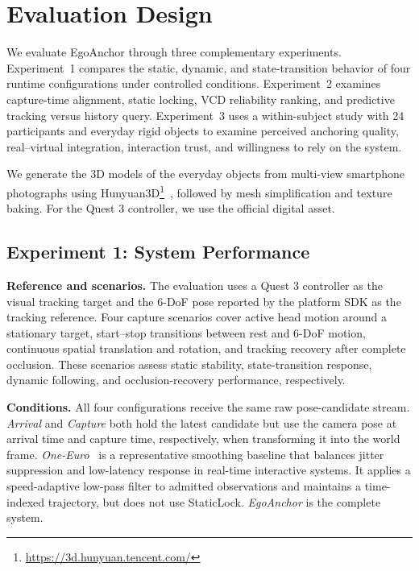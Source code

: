 \documentclass[review]{vgtc}
\begin{document}
\section{Evaluation Design}\label{sec:evaluation}

We evaluate EgoAnchor through three complementary experiments. Experiment~1 compares the static, dynamic, and state-transition behavior of four runtime configurations under controlled conditions. Experiment~2 examines capture-time alignment, static locking, VCD reliability ranking, and predictive tracking versus history query. Experiment~3 uses a within-subject study with 24 participants and everyday rigid objects to examine perceived anchoring quality, real--virtual integration, interaction trust, and willingness to rely on the system.

We generate the 3D models of the everyday objects from multi-view smartphone photographs using Hunyuan3D\footnote{\url{https://3d.hunyuan.tencent.com/}}~\cite{hunyuan3d22025tencent}, followed by mesh simplification and texture baking. For the Quest 3 controller, we use the official digital asset.

\subsection{Experiment 1: System Performance}\label{sec:exp1-design}

\textbf{Reference and scenarios.}
The evaluation uses a Quest 3 controller as the visual tracking target and the 6-DoF pose reported by the platform SDK as the tracking reference. Four capture scenarios cover active head motion around a stationary target, start--stop transitions between rest and 6-DoF motion, continuous spatial translation and rotation, and tracking recovery after complete occlusion. These scenarios assess static stability, state-transition response, dynamic following, and occlusion-recovery performance, respectively.

\textbf{Conditions.}
All four configurations receive the same raw pose-candidate stream. \textit{Arrival} and \textit{Capture} both hold the latest candidate but use the camera pose at arrival time and capture time, respectively, when transforming it into the world frame. \textit{One-Euro}~\cite{casiez2012oneeuro} is a representative smoothing baseline that balances jitter suppression and low-latency response in real-time interactive systems. It applies a speed-adaptive low-pass filter to admitted observations and maintains a time-indexed trajectory, but does not use StaticLock. \textit{EgoAnchor} is the complete system.
\end{document}
